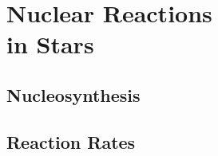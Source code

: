 \chapter[Nuclear Reactions in Stars]{\textbf{Nuclear Reactions \\ in Stars}}
\label{ch:reactions}




\section{Nucleosynthesis}




\section{Reaction Rates} \label{sec:rates}

